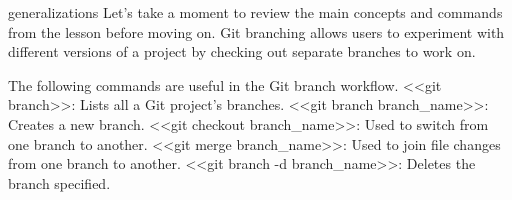 generalizations
Let’s take a moment to review the main concepts and commands from the lesson before moving on.
    Git branching allows users to experiment with different versions of a project by checking out separate branches to work on.

The following commands are useful in the Git branch workflow.
    <<git branch>>: Lists all a Git project’s branches.
    <<git branch branch_name>>: Creates a new branch.
    <<git checkout branch_name>>: Used to switch from one branch to another.
    <<git merge branch_name>>: Used to join file changes from one branch to another.
    <<git branch -d branch_name>>: Deletes the branch specified.